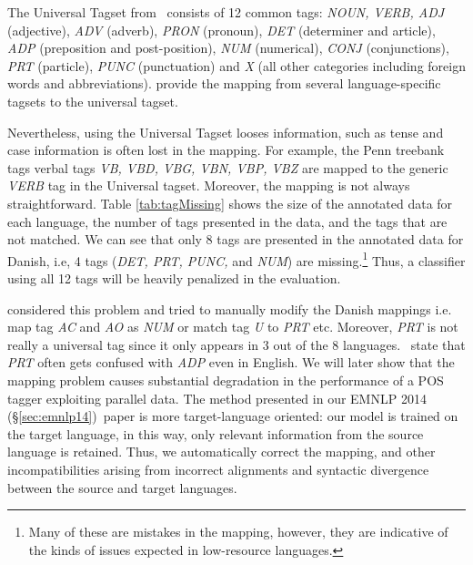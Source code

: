 \documentclass[12pt,twoside,final,hidelinks]{ltthesis}
\theoremstyle{definition}
\newcommand\emnlpiv{EMNLP 2014 (\S\ref{sec:emnlp14})}
\begin{document}
The Universal Tagset from~ consists of 12 common tags: \textit{NOUN, VERB, ADJ} (adjective), \textit{ADV} (adverb), \textit{PRON} (pronoun), \textit{DET} (determiner and article), \textit{ADP} (preposition and post-position), \textit{NUM} (numerical), \textit{CONJ} (conjunctions), \textit{PRT} (particle), \textit{PUNC} (punctuation) and \textit{X} (all other categories including foreign words and abbreviations).  provide the mapping from several language-specific tagsets to the universal tagset.

Nevertheless, using the Universal Tagset looses information, such as tense and case information is often lost in the mapping. For example, the Penn treebank tags verbal tags \textit{VB, VBD, VBG, VBN, VBP, VBZ} are mapped to the generic \textit{VERB} tag in the Universal tagset. Moreover, the mapping is not always straightforward. Table \ref{tab:tagMissing} shows the size of the annotated data for each language, the number of tags presented in the data, and the tags that are not matched. We can see that only 8 tags are presented in the annotated data for Danish, i.e, 4 tags (\textit{DET, PRT, PUNC,} and \textit{NUM}) are missing.\footnote{Many of these are mistakes in the mapping, however, they are indicative of the kinds of issues expected in low-resource languages.}
Thus, a classifier using all 12 tags will be heavily penalized in the evaluation.

 considered this problem and tried to manually modify the Danish mappings i.e. map tag \textit{AC} and \textit{AO} as \textit{NUM} or match tag \textit{U} to \textit{PRT} etc. Moreover, \textit{PRT} is not really a universal tag since it only appears in 3 out of the 8 languages.~ state that \textit{PRT} often gets confused with \textit{ADP} even in English. We will later show that the mapping problem causes substantial degradation in the performance of a POS tagger exploiting parallel data. The method presented in our \emnlpiv\ paper is more target-language oriented: our model is trained on the target language, in this way, only relevant information from the source language is retained. Thus, we automatically correct the mapping, and other incompatibilities arising from incorrect alignments and syntactic divergence between the source and target languages. 
 
\end{document}
